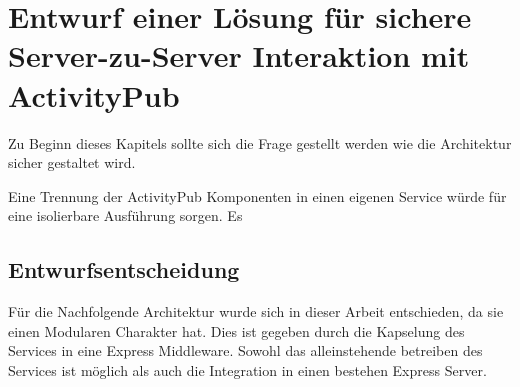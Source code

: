 
\chapter{Entwurf einer Lösung für sichere Server-zu-Server Interaktion mit ActivityPub}
Zu Beginn dieses Kapitels sollte sich die Frage gestellt werden wie die Architektur sicher gestaltet wird. 

Eine Trennung der ActivityPub Komponenten in einen eigenen Service würde für eine isolierbare Ausführung sorgen. Es
\section{Entwurfsentscheidung}
Für die Nachfolgende Architektur wurde sich in dieser Arbeit entschieden, da sie einen Modularen Charakter hat. Dies ist gegeben durch die Kapselung des Services in eine Express Middleware. Sowohl das alleinstehende betreiben des Services ist möglich als auch die Integration in einen bestehen Express Server.
